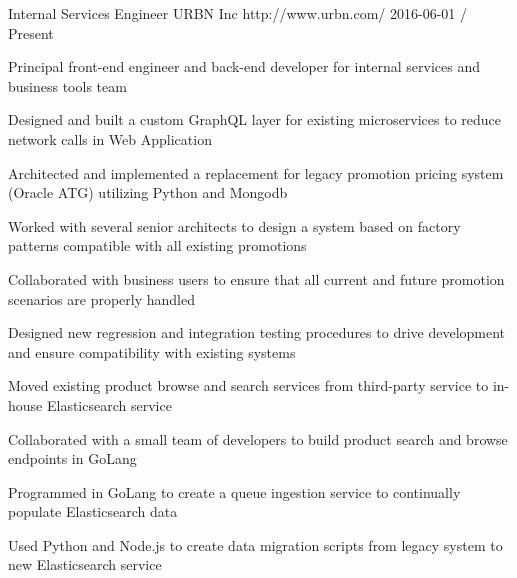 \documentclass[11pt, a4paper]{awesome-cv}
\begin{document}
\makecvheader

\begin{cventries}
 
  \cventry
    {Internal Services Engineer}
    {URBN Inc}
    {http://www.urbn.com/}
    {2016-06-01 / Present}
    {
          \begin{cvitems}
                \item{Principal front-end engineer and back-end developer for internal services and business tools team}
                \item{Designed and built a custom GraphQL layer for existing microservices to reduce network calls in Web Application}
                \item{Architected and implemented a replacement for legacy promotion pricing system (Oracle ATG) utilizing Python and Mongodb}
                    \begin{cvitemssub}
                        \item{Worked with several senior architects to design a system based on factory patterns compatible with all existing promotions}
                        \item{Collaborated with business users to ensure that all current and future promotion scenarios are properly handled}
                        \item{Designed new regression and integration testing procedures to drive development and ensure compatibility with existing systems}
                    \end{cvitemssub}
                \item{Moved existing product browse and search services from third-party service to in-house Elasticsearch service}
                    \begin{cvitemssub}
                        \item{Collaborated with a small team of developers to build product search and browse endpoints in GoLang}
                        \item{Programmed in GoLang to create a queue ingestion service to continually populate Elasticsearch data}
                        \item{Used Python and Node.js to create data migration scripts from legacy system to new Elasticsearch service}

\end{cvitemssub}
\end{cvitems}}
\end{cventries}
\end{document}
